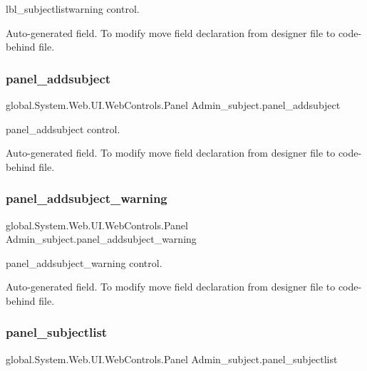 lbl\+\_\+subjectlistwarning control. 

Auto-\/generated field. To modify move field declaration from designer file to code-\/behind file. \mbox{\label{class_admin__subject_acadc2239916fc3693c767eb1f49ac326}} 
\subsubsection{\texorpdfstring{panel\_addsubject}{panel\_addsubject}}
{\footnotesize\ttfamily global.\+System.\+Web.\+U\+I.\+Web\+Controls.\+Panel Admin\+\_\+subject.\+panel\+\_\+addsubject\hspace{0.3cm}{\ttfamily [protected]}}



panel\+\_\+addsubject control. 

Auto-\/generated field. To modify move field declaration from designer file to code-\/behind file. \mbox{\label{class_admin__subject_ac17e12ca2da95ef3eb470ff1c3522494}} 
\subsubsection{\texorpdfstring{panel\_addsubject\_warning}{panel\_addsubject\_warning}}
{\footnotesize\ttfamily global.\+System.\+Web.\+U\+I.\+Web\+Controls.\+Panel Admin\+\_\+subject.\+panel\+\_\+addsubject\+\_\+warning\hspace{0.3cm}{\ttfamily [protected]}}



panel\+\_\+addsubject\+\_\+warning control. 

Auto-\/generated field. To modify move field declaration from designer file to code-\/behind file. \mbox{\label{class_admin__subject_a413f1ba966649d23b930fa430bf0feed}} 
\subsubsection{\texorpdfstring{panel\_subjectlist}{panel\_subjectlist}}
{\footnotesize\ttfamily global.\+System.\+Web.\+U\+I.\+Web\+Controls.\+Panel Admin\+\_\+subject.\+panel\+\_\+subjectlist\hspace{0.3cm}{\ttfamily [protected]}}



